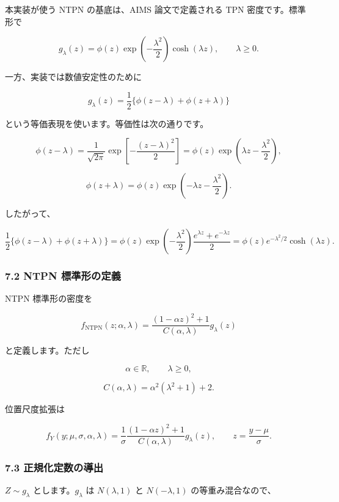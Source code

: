 \documentclass[
]{article}
\begin{document}
本実装が使う NTPN の基底は、AIMS 論文で定義される TPN 密度です。標準形で

\[
g_\lambda(z)=\phi(z)\exp\left(-\frac{\lambda^2}{2}\right)\cosh(\lambda z),
\qquad
\lambda\ge0.
\]

一方、実装では数値安定性のために

\[
g_\lambda(z)=\frac{1}{2}\{\phi(z-\lambda)+\phi(z+\lambda)\}
\]

という等価表現を使います。等価性は次の通りです。

\[
\phi(z-\lambda)
=\frac{1}{\sqrt{2\pi}}\exp\left[-\frac{(z-\lambda)^2}{2}\right]
=\phi(z)\exp\left(\lambda z-\frac{\lambda^2}{2}\right),
\]

\[
\phi(z+\lambda)
=\phi(z)\exp\left(-\lambda z-\frac{\lambda^2}{2}\right).
\]

したがって、

\[
\frac{1}{2}\{\phi(z-\lambda)+\phi(z+\lambda)\}
=\phi(z)\exp\left(-\frac{\lambda^2}{2}\right)
\frac{e^{\lambda z}+e^{-\lambda z}}{2}
=\phi(z)e^{-\lambda^2/2}\cosh(\lambda z).
\]

\hypertarget{ntpn-ux6a19ux6e96ux5f62ux306eux5b9aux7fa9}{%
\subsubsection{7.2 NTPN
標準形の定義}\label{ntpn-ux6a19ux6e96ux5f62ux306eux5b9aux7fa9}}

NTPN 標準形の密度を

\[
f_{\mathrm{NTPN}}(z;\alpha,\lambda)
=\frac{(1-\alpha z)^2+1}{C(\alpha,\lambda)}g_\lambda(z)
\]

と定義します。ただし

\[
\alpha\in\mathbb{R},
\qquad
\lambda\ge0,
\]

\[
C(\alpha,\lambda)=\alpha^2(\lambda^2+1)+2.
\]

位置尺度拡張は

\[
f_Y(y;\mu,\sigma,\alpha,\lambda)
=\frac{1}{\sigma}
\frac{(1-\alpha z)^2+1}{C(\alpha,\lambda)}g_\lambda(z),
\qquad
z=\frac{y-\mu}{\sigma}.
\]

\hypertarget{ux6b63ux898fux5316ux5b9aux6570ux306eux5c0eux51fa}{%
\subsubsection{7.3
正規化定数の導出}\label{ux6b63ux898fux5316ux5b9aux6570ux306eux5c0eux51fa}}

\(Z\sim g_\lambda\) とします。\(g_\lambda\) は \(N(\lambda,1)\) と
\(N(-\lambda,1)\) の等重み混合なので、
\end{document}
